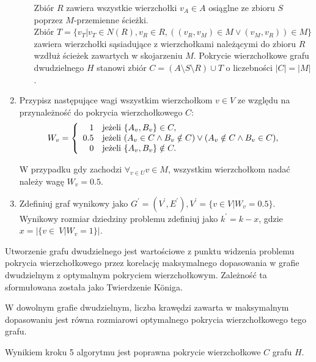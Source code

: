 \begin{enumerate}
\begin{itemize}
        Zbiór $R$ zawiera wszystkie wierzchołki $v_A \in A$ osiąglne ze zbioru $S$ poprzez $M$-przemienne ścieżki. \\
        Zbiór $T=\{v_T|v_T \in N(R), v_R \in R, ((v_R,v_M) \in M \lor (v_M,v_R)) \in M\}$ zawiera wierzchołki sąsiadujące z wierzchołkami należącymi do zbioru $R$ wzdłuż ścieżek zawartych w skojarzeniu $M$.
        Pokrycie wierzchołkowe grafu dwudzielnego $H$ stanowi zbiór $C=(A \setminus S \setminus R) \cup T$ o liczebności $|C|=|M|$.
    \end{itemize}
  \item Przypisz następujące wagi wszystkim wierzchołkom $v \in V$ ze względu na przynależność do pokrycia wierzchołkowego $C$:
    \begin{equation*}
    W_v = \left\{
    \begin{array}{rl}
    1 & \textnormal{jeżeli } \{A_v, B_v\} \in C,\\
    0.5 & \textnormal{jeżeli } (A_v \in C \land B_v \notin C) \lor (A_v \notin C \land B_v \in C),\\
    0 & \textnormal{jeżeli } \{A_v, B_v\} \notin C.
    \end{array} \right.
    \end{equation*}

    W przypadku gdy zachodzi $\forall_{v \in U}{v \in M}$, wszystkim wierzchołkom nadać należy wagę $W_v=0.5$.
  \item Zdefiniuj graf wynikowy jako 
    $G^\prime=(V^\prime, E^\prime), V^\prime=\{v \in V|W_v=0.5\}$.
    Wynikowy rozmiar dziedziny problemu zdefiniuj jako 
    $k^\prime=k-x$, gdzie $x=|\{v\in~V|W_v=1\}|$.
\end{enumerate}
Utworzenie grafu dwudzielnego jest wartościowe z punktu widzenia problemu
pokrycia wierzchołkowego przez korelację maksymalnego dopasowania w grafie
dwudzielnym z optymalnym pokryciem wierzchołkowym. 
Zależność ta sformułowana została jako Twierdzenie K\"oniga.
\begin{theorem}
  W dowolnym grafie dwudzielnym, liczba krawędzi zawarta w maksymalnym
  dopasowaniu jest równa rozmiarowi optymalnego pokrycia wierzchołkowego tego
  grafu.
\end{theorem}
\begin{theorem}\label{theorem_nf1}
  Wynikiem kroku 5 algorytmu jest poprawna pokrycie wierzchołkowe $C$ grafu $H$.
\end{theorem}
